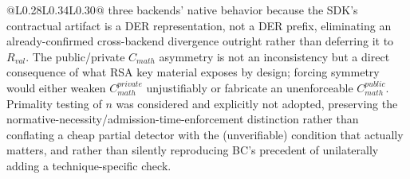 \documentclass[11pt,a4paper]{article}
\begin{document}
\begin{longtable}{@{}L{0.28\textwidth}L{0.34\textwidth}L{0.30\textwidth}@{}}
three backends' native behavior because the SDK's contractual artifact is a DER representation, not a DER prefix, eliminating an already-confirmed cross-backend divergence outright rather than deferring it to $R_{val}$. The public/private $C_{math}$ asymmetry is not an inconsistency but a direct consequence of what RSA key material exposes by design; forcing symmetry would either weaken $C_{math}^{private}$ unjustifiably or fabricate an unenforceable $C_{math}^{public}$. Primality testing of $n$ was considered and explicitly not adopted, preserving the normative-necessity/admission-time-enforcement distinction rather than conflating a cheap partial detector with the (unverifiable) condition that actually matters, and rather than silently reproducing BC's precedent of unilaterally adding a technique-specific check.\\

\end{longtable}
\end{document}
